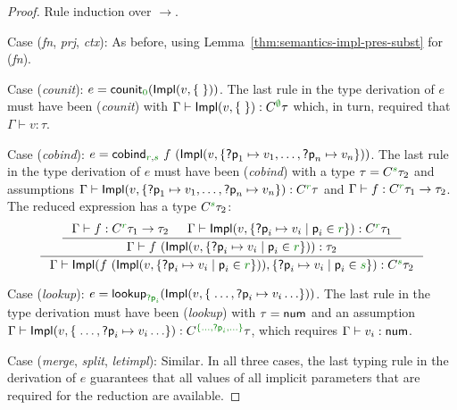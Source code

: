 \begin{proof}
  Rule induction over $\rightarrow$.
  
\vspace{0.25em}\noindent\hangindent=0.6cm 
Case (\emph{fn}, \emph{prj}, \emph{ctx}): As before, using Lemma~\ref{thm:semantics-impl-pres-subst} for (\emph{fn}).

\vspace{0.25em}\noindent\hangindent=0.6cm 
Case (\emph{counit}): $e = \ident{counit}_{\cclrd{0}}(\ident{Impl}(v, \{\;\}))$. The last rule in the type
  derivation of $e$ must have been (\emph{counit}) with $\Gamma \vdash \ident{Impl}(v, \{ \; \}) : \ctyp{\cclrd{\emptyset}}\tau$
  which, in turn, required that $\Gamma \vdash v : \tau$.

\newpage

\vspace{0.25em}\noindent\hangindent=0.6cm 
Case (\emph{cobind}): $e = \ident{cobind}_{\cclrd{r}, \cclrd{s}}~f~(\ident{Impl}(v, \{ \ident{?p}_1\mapsto v_1, \ldots, \ident{?p}_n\mapsto v_n  \}))$.  
  The last rule in the type derivation of $e$ must have been (\emph{cobind}) with a type $\tau = \ctyp{\cclrd{s}}\tau_2$ and assumptions
  $\Gamma \vdash \ident{Impl}(v, \{ \ident{?p}_1\mapsto v_1, \ldots, \ident{?p}_n\mapsto v_n  \}) : \ctyp{\cclrd{r}}{\tau}$ and
  $\Gamma \vdash f : \ctyp{\cclrd{r}}{\tau_1} \rightarrow \tau_2$.
  The reduced expression has a type $\ctyp{\cclrd{s}}\tau_2$:
\begin{equation*}
\inference
  { \inference 
      { \Gamma \vdash f : \ctyp{\cclrd{r}}{\tau_1} \rightarrow \tau_2 & 
        \Gamma \vdash \ident{Impl}(v, \{ \ident{?p}_i \mapsto v_i \;|\; \ident{p}_i \in \cclrd{r} \} ) :  \ctyp{\cclrd{r}}{\tau_1}}  
      { \Gamma \vdash f~(\ident{Impl}(v, \{ \ident{?p}_i \mapsto v_i \;|\; \ident{p}_i \in \cclrd{r} \} )) : \tau_2} }
  { \Gamma \vdash \ident{Impl}(f~(\ident{Impl}(v, \{ \ident{?p}_i \mapsto v_i \;|\; \ident{p}_i \in \cclrd{r} \} )), \{ \ident{?p}_i \mapsto v_i \;|\; \ident{p}_i \in \cclrd{s} \}) : \ctyp{\cclrd{s}}\tau_2 }
\end{equation*}

\vspace{0.25em}\noindent\hangindent=0.6cm 
Case (\emph{lookup}): $e = \ident{lookup}_{\cclrd{\ident{?p}_i}}(\ident{Impl}(v, \{\; \ldots, \ident{?p}_i \mapsto v_i \ldots \}))$. The last rule in the type
  derivation must have been (\emph{lookup}) with $\tau = \ident{num}$ and an assumption $\Gamma\vdash\ident{Impl}(v, \{\; \ldots, \ident{?p}_i\mapsto v_i \ldots \}) : \ctyp{\cclrd{ \{\ldots,\ident{?p}_i,\ldots\} }}{\tau}$,
  which requires $\Gamma \vdash v_i : \textnormal{\sffamily num}$.

\vspace{0.25em}\noindent\hangindent=0.6cm 
Case (\emph{merge}, \emph{split}, \emph{letimpl}): Similar. In all three cases, the last typing rule in the derivation of $e$
  guarantees that all values of all implicit parameters that are required for the reduction are available.
\end{proof}

